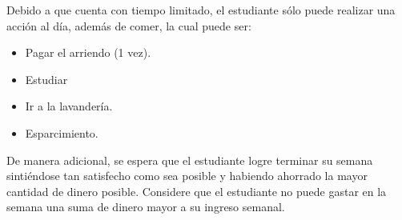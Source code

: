 \documentclass{article}
\begin{document}
Debido a que cuenta con tiempo limitado, el estudiante sólo puede realizar una acción al día, además de comer, la cual puede ser:
\begin{itemize}
  \item Pagar el arriendo (1 vez).
  \item Estudiar
  \item Ir a la lavandería.
  \item Esparcimiento.
\end{itemize}

De manera adicional, se espera que el estudiante logre terminar su semana sintiéndose tan satisfecho como sea posible y habiendo ahorrado la mayor cantidad de dinero posible. Considere que el estudiante no puede gastar en la semana una suma de dinero mayor a su ingreso semanal.
\end{document}

